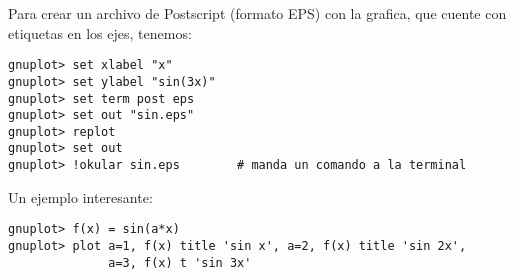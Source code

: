 Para crear un archivo de Postscript (formato EPS) con la grafica, que cuente
con etiquetas en los ejes, tenemos:
\begin{lstlisting}
gnuplot> set xlabel "x"
gnuplot> set ylabel "sin(3x)"
gnuplot> set term post eps
gnuplot> set out "sin.eps"
gnuplot> replot
gnuplot> set out
gnuplot> !okular sin.eps		# manda un comando a la terminal
\end{lstlisting}

Un ejemplo interesante:
\begin{lstlisting}
gnuplot> f(x) = sin(a*x)
gnuplot> plot a=1, f(x) title 'sin x', a=2, f(x) title 'sin 2x', 
              a=3, f(x) t 'sin 3x'
\end{lstlisting}

% 

 
